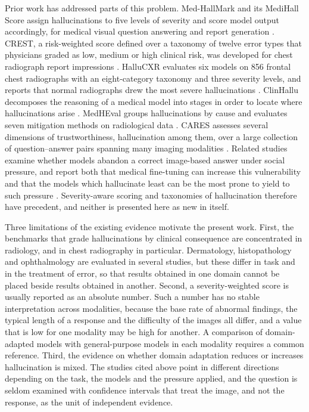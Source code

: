 Prior work has addressed parts of this problem. Med-HallMark and its MediHall Score assign hallucinations to five levels of severity and score model output accordingly, for medical visual question answering and report generation \citep{chen2024medhallmark}. CREST, a risk-weighted score defined over a taxonomy of twelve error types that physicians graded as low, medium or high clinical risk, was developed for chest radiograph report impressions \citep{crest2025medrxiv}. HalluCXR evaluates six models on 856 frontal chest radiographs with an eight-category taxonomy and three severity levels, and reports that normal radiographs drew the most severe hallucinations \citep{wang2026hallucxr}. ClinHallu decomposes the reasoning of a medical model into stages in order to locate where hallucinations arise \citep{yang2026clinhallu}. MedHEval groups hallucinations by cause and evaluates seven mitigation methods on radiological data \citep{chang2025medheval}. CARES assesses several dimensions of trustworthiness, hallucination among them, over a large collection of question--answer pairs spanning many imaging modalities \citep{xia2024cares}. Related studies examine whether models abandon a correct image-based answer under social pressure, and report both that medical fine-tuning can increase this vulnerability \citep{xu2025sycophancy} and that the models which hallucinate least can be the most prone to yield to such pressure \citep{aranya2026grounding}. Severity-aware scoring and taxonomies of hallucination therefore have precedent, and neither is presented here as new in itself.

Three limitations of the existing evidence motivate the present work. First, the benchmarks that grade hallucinations by clinical consequence are concentrated in radiology, and in chest radiography in particular. Dermatology, histopathology and ophthalmology are evaluated in several studies, but these differ in task and in the treatment of error, so that results obtained in one domain cannot be placed beside results obtained in another. Second, a severity-weighted score is usually reported as an absolute number. Such a number has no stable interpretation across modalities, because the base rate of abnormal findings, the typical length of a response and the difficulty of the images all differ, and a value that is low for one modality may be high for another. A comparison of domain-adapted models with general-purpose models in each modality requires a common reference. Third, the evidence on whether domain adaptation reduces or increases hallucination is mixed. The studies cited above point in different directions depending on the task, the models and the pressure applied, and the question is seldom examined with confidence intervals that treat the image, and not the response, as the unit of independent evidence.

